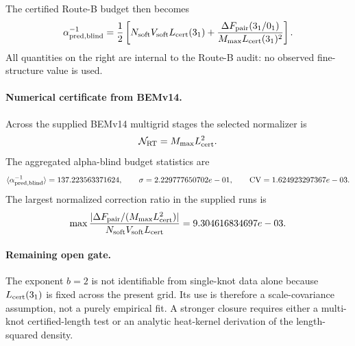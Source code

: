 The certified Route-B budget then becomes
\[
\alpha^{-1}_{\rm pred,blind}
=
\frac12
\left[
N_{\rm soft}V_{\rm soft}L_{\rm cert}(3_1)
+
\frac{\Delta F_{\rm pair}(3_1/0_1)}
{M_{\max}L_{\rm cert}(3_1)^2}
\right].
\]
All quantities on the right are internal to the Route-B audit: no observed
fine-structure value is used.

\paragraph{Numerical certificate from BEMv14.}
Across the supplied BEMv14 multigrid stages the selected normalizer is
\[
\mathcal N_{\rm RT}=M_{\max}L_{\rm cert}^2 .
\]
The aggregated alpha-blind budget statistics are
\[
\langle \alpha^{-1}_{\rm pred,blind}\rangle
=
137.223563371624,
\qquad
\sigma
=
2.229777650702e-01,
\qquad
{\rm CV}
=
1.624923297367e-03.
\]
The largest normalized correction ratio in the supplied runs is
\[
\max
\frac{|\Delta F_{\rm pair}/(M_{\max}L_{\rm cert}^2)|}
{N_{\rm soft}V_{\rm soft}L_{\rm cert}}
=
9.304616834697e-03.
\]

\paragraph{Remaining open gate.}
The exponent \(b=2\) is not identifiable from single-knot data alone because
\(L_{\rm cert}(3_1)\) is fixed across the present grid. Its use is therefore
a scale-covariance assumption, not a purely empirical fit. A stronger closure
requires either a multi-knot certified-length test or an analytic heat-kernel
derivation of the length-squared density.
